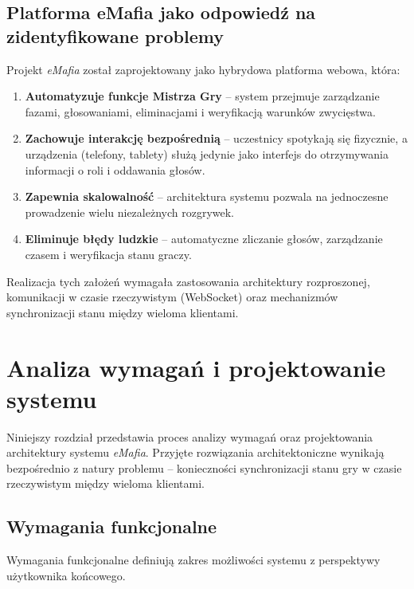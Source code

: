 ﻿\documentclass[a4paper,twoside,11pt]{mwrep}
\theoremstyle{plain} \newtheorem{thm}{Twierdzenie}
\theoremstyle{plain} \newtheorem{lem}{Lemat}
\theoremstyle{definition} \newtheorem{defn}{Definicja}
\theoremstyle{remark} \newtheorem*{rem}{Wniosek}
\begin{document}
\section{Platforma eMafia jako odpowiedź na zidentyfikowane problemy}

Projekt \textit{eMafia} został zaprojektowany jako hybrydowa platforma webowa, która:

\begin{enumerate}
    \item \textbf{Automatyzuje funkcje Mistrza Gry} -- system przejmuje zarządzanie fazami, głosowaniami, eliminacjami i weryfikacją warunków zwycięstwa.
    
    \item \textbf{Zachowuje interakcję bezpośrednią} -- uczestnicy spotykają się fizycznie, a urządzenia (telefony, tablety) służą jedynie jako interfejs do otrzymywania informacji o roli i oddawania głosów.
    
    \item \textbf{Zapewnia skalowalność} -- architektura systemu pozwala na jednoczesne prowadzenie wielu niezależnych rozgrywek.
    
    \item \textbf{Eliminuje błędy ludzkie} -- automatyczne zliczanie głosów, zarządzanie czasem i weryfikacja stanu graczy.
\end{enumerate}

Realizacja tych założeń wymagała zastosowania architektury rozproszonej, komunikacji w czasie rzeczywistym (WebSocket) oraz mechanizmów synchronizacji stanu między wieloma klientami.
\chapter{Analiza wymagań i projektowanie systemu}
\label{chap:analiza_wymagan}

Niniejszy rozdział przedstawia proces analizy wymagań oraz projektowania architektury systemu \textit{eMafia}. Przyjęte rozwiązania architektoniczne wynikają bezpośrednio z natury problemu -- konieczności synchronizacji stanu gry w czasie rzeczywistym między wieloma klientami.

\section{Wymagania funkcjonalne}

Wymagania funkcjonalne definiują zakres możliwości systemu z perspektywy użytkownika końcowego.
\end{document}
